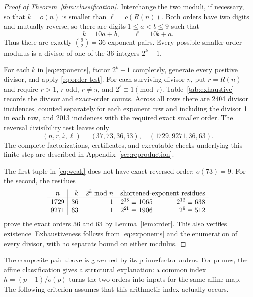 \documentclass[11pt]{amsart}
\theoremstyle{remark}\newtheorem{remark}[theorem]{Remark}
\newcommand{\rev}{R}
\begin{document}
\begin{proof}[Proof of Theorem~\ref{thm:classification}]
Interchange the two moduli, if necessary, so that $k=o(n)$ is smaller
than $\ell=o(\rev(n))$. Both orders have two digits and mutually reverse,
so there are digits $1\le a<b\le9$ such that
\begin{equation}\label{eq:exponents}
 k=10a+b,\qquad \ell=10b+a.
\end{equation}
Thus there are exactly $\binom92=36$ exponent pairs. Every possible
smaller-order modulus is a divisor of one of the 36 integers $2^k-1$.

For each $k$ in \eqref{eq:exponents}, factor $2^k-1$ completely, generate
every positive divisor, and apply \eqref{eq:order-test}. For each
surviving divisor $n$, put $r=\rev(n)$ and require $r>1$, $r$ odd,
$r\ne n$, and $2^\ell\equiv1\pmod r$. Table~\ref{tab:exhaustive}
records the divisor and exact-order counts. Across all rows there are
2404 divisor incidences, counted separately for each exponent row and including the divisor 1 in each row, and
2013 incidences with the required exact smaller order. The reversal
divisibility test leaves only
\begin{equation}\label{eq:weak}
 (n,r,k,\ell)=(37,73,36,63),\quad (1729,9271,36,63).
\end{equation}
The complete factorizations, certificates, and executable checks
underlying this finite step are described in Appendix~\ref{sec:reproduction}.

The first tuple in \eqref{eq:weak} does not have exact reversed order:
$o(73)=9$. For the second, the residues
\[
\begin{array}{c|rrrr}
n&k&2^k\bmod n&\multicolumn{2}{c}{\text{shortened-exponent residues}}\\\hline
1729&36&1&2^{18}\equiv1065&2^{12}\equiv638\\
9271&63&1&2^{21}\equiv1906&2^9\equiv512
\end{array}
\]
prove the exact orders 36 and 63 by Lemma~\ref{lem:order}. This also
verifies existence. Exhaustiveness follows from
\eqref{eq:exponents} and the enumeration of every divisor, with no
separate bound on either modulus.
\end{proof}


The composite pair above is governed by its prime-factor orders. For primes, the affine classification gives a structural explanation: a common index $h=(p-1)/o(p)$ turns the two orders into inputs for the same affine map. The following criterion assumes that this arithmetic index actually occurs.
\end{document}
